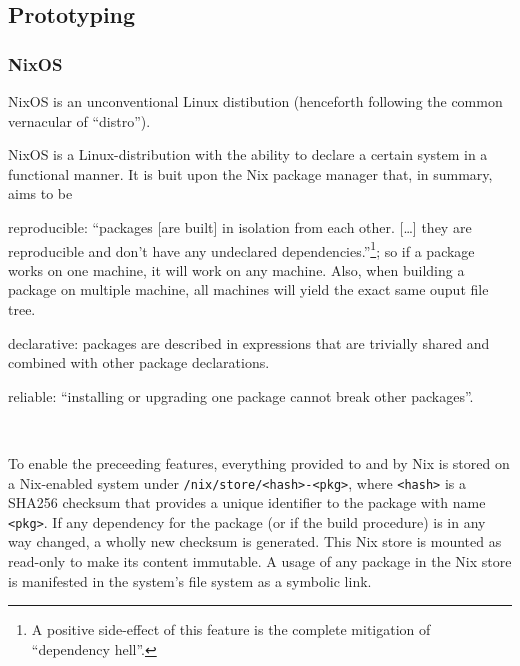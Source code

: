 
\subsection{Prototyping}

\subsubsection{NixOS}
NixOS is an unconventional Linux distibution (henceforth following the common vernacular of ``distro'').



NixOS is a Linux-distribution with the ability to declare a certain system in a functional manner.
It is buit upon the Nix package manager that, in summary, aims to be
\begin{inline-enum}
\item reproducible:
  ``packages [are built] in isolation from each other. [\ldots] they are reproducible and don't have any undeclared dependencies.''\footnote{A positive side-effect of this feature is the complete mitigation of ``dependency hell''.};
  so if a package works on one machine, it will work on any machine.
  Also, when building a package on multiple machine, all machines will yield the exact same ouput file tree.
\item declarative:
  packages are described in expressions that are trivially shared and combined with other package declarations.
\item reliable:
  ``installing or upgrading one package cannot break other packages''.
\end{inline-enum}~\parencite{nixos.org}

To enable the preceeding features, everything provided to and by Nix is stored on a Nix-enabled system under \texttt{/nix/store/<hash>-<pkg>},
where \texttt{<hash>} is a SHA256 checksum that provides a unique identifier to the package with name \texttt{<pkg>}.
If any dependency for the package (or if the build procedure) is in any way changed, a wholly new checksum is generated.
This Nix store is mounted as read-only to make its content immutable.
A usage of any package in the Nix store is manifested in the system's file system as a symbolic link.

